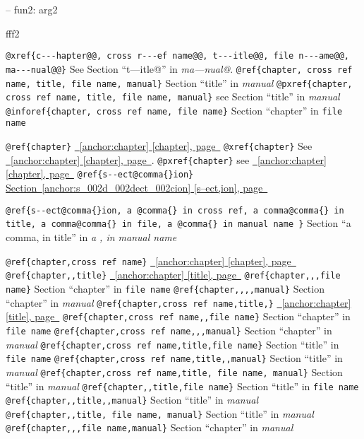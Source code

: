 \documentclass{book}
\begin{document}
\begin{titlepage}
\hbox{}-- fun2: arg2


%
fff2


\texttt{@xref\{c{-}{-}{-}hapter@@, cross r{-}{-}{-}ef name@@, t{-}{-}{-}itle@@, file n{-}{-}{-}ame@@, ma{-}{-}{-}nual@@\}} See Section ``t---itle@'' in \textit{ma---nual@}.
\texttt{@ref\{chapter, cross ref name, title, file name, manual\}} Section ``title'' in \textit{manual}
\texttt{@pxref\{chapter, cross ref name, title, file name, manual\}} see Section ``title'' in \textit{manual}
\texttt{@inforef\{chapter, cross ref name, file name\}} Section ``chapter'' in \texttt{file name}

\texttt{@ref\{chapter\}} \hyperref[anchor:chapter]{\chaptername~\ref*{anchor:chapter} [chapter], page~\pageref*{anchor:chapter}}
\texttt{@xref\{chapter\}} See \hyperref[anchor:chapter]{\chaptername~\ref*{anchor:chapter} [chapter], page~\pageref*{anchor:chapter}}.
\texttt{@pxref\{chapter\}} see \hyperref[anchor:chapter]{\chaptername~\ref*{anchor:chapter} [chapter], page~\pageref*{anchor:chapter}}
\texttt{@ref\{s{-}{-}ect@comma\{\}ion\}} \hyperref[anchor:s_002d_002dect_002cion]{Section~\ref*{anchor:s_002d_002dect_002cion} [s--ect,ion], page~\pageref*{anchor:s_002d_002dect_002cion}}

\texttt{@ref\{s{-}{-}ect@comma\{\}ion, a @comma\{\} in cross
ref, a comma@comma\{\} in title, a comma@comma\{\} in file, a @comma\{\} in manual name \}}
Section ``a comma, in title'' in \textit{a , in manual name}

\texttt{@ref\{chapter,cross ref name\}} \hyperref[anchor:chapter]{\chaptername~\ref*{anchor:chapter} [chapter], page~\pageref*{anchor:chapter}}
\texttt{@ref\{chapter,,title\}} \hyperref[anchor:chapter]{\chaptername~\ref*{anchor:chapter} [title], page~\pageref*{anchor:chapter}}
\texttt{@ref\{chapter,,,file name\}} Section ``chapter'' in \texttt{file name}
\texttt{@ref\{chapter,,,,manual\}} Section ``chapter'' in \textit{manual}
\texttt{@ref\{chapter,cross ref name,title,\}} \hyperref[anchor:chapter]{\chaptername~\ref*{anchor:chapter} [title], page~\pageref*{anchor:chapter}}
\texttt{@ref\{chapter,cross ref name,,file name\}} Section ``chapter'' in \texttt{file name}
\texttt{@ref\{chapter,cross ref name,,,manual\}} Section ``chapter'' in \textit{manual}
\texttt{@ref\{chapter,cross ref name,title,file name\}} Section ``title'' in \texttt{file name}
\texttt{@ref\{chapter,cross ref name,title,,manual\}} Section ``title'' in \textit{manual}
\texttt{@ref\{chapter,cross ref name,title, file name, manual\}} Section ``title'' in \textit{manual}
\texttt{@ref\{chapter,,title,file name\}} Section ``title'' in \texttt{file name}
\texttt{@ref\{chapter,,title,,manual\}} Section ``title'' in \textit{manual}
\texttt{@ref\{chapter,,title, file name, manual\}} Section ``title'' in \textit{manual}
\texttt{@ref\{chapter,,,file name,manual\}} Section ``chapter'' in \textit{manual}



\end{titlepage}
\end{document}
